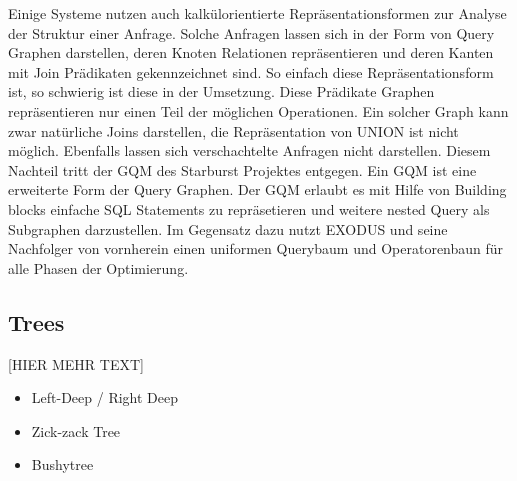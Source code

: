 Einige Systeme nutzen auch kalkülorientierte Repräsentationsformen zur Analyse der Struktur einer Anfrage. Solche Anfragen lassen sich in der Form von Query Graphen darstellen, deren Knoten Relationen repräsentieren und deren Kanten mit Join Prädikaten gekennzeichnet sind. So einfach diese Repräsentationsform ist, so schwierig ist diese in der Umsetzung. Diese Prädikate Graphen repräsentieren nur einen Teil der möglichen Operationen. Ein solcher Graph kann zwar natürliche Joins darstellen, die Repräsentation von UNION ist nicht möglich. Ebenfalls lassen sich verschachtelte Anfragen nicht darstellen. Diesem Nachteil tritt der GQM des Starburst Projektes entgegen. Ein GQM ist eine erweiterte Form der Query Graphen. Der GQM erlaubt es mit Hilfe von Building blocks einfache SQL Statements zu repräsetieren und weitere nested Query als Subgraphen darzustellen. Im Gegensatz dazu nutzt EXODUS und seine Nachfolger von vornherein einen uniformen Querybaum und Operatorenbaun für alle Phasen der Optimierung.



\subsection{Trees}

[HIER MEHR TEXT]
\cite{ioannidis1991left}
\begin{itemize}
\item Left-Deep / Right Deep
\item Zick-zack Tree
\item Bushytree
\end{itemize}